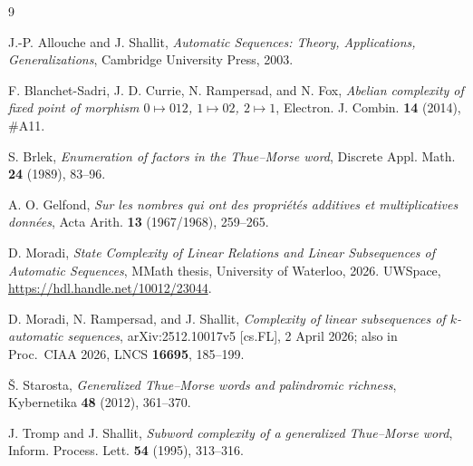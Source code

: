 \documentclass[10pt,reqno]{amsart}
\theoremstyle{plain}
\theoremstyle{definition}
\theoremstyle{remark}
\numberwithin{theorem}{section}
\begin{document}
\begin{thebibliography}{9}
\setlength{\itemsep}{0pt}\setlength{\parsep}{0pt}\setlength{\parskip}{0pt}

J.-P. Allouche and J. Shallit,
\emph{Automatic Sequences: Theory, Applications, Generalizations},
Cambridge University Press, 2003.

F. Blanchet-Sadri, J. D. Currie, N. Rampersad, and N. Fox,
\emph{Abelian complexity of fixed point of morphism $0 \mapsto 012$, $1 \mapsto 02$,
$2 \mapsto 1$},
Electron. J. Combin. \textbf{14} (2014), \#A11.

S. Brlek,
\emph{Enumeration of factors in the Thue--Morse word},
Discrete Appl. Math. \textbf{24} (1989), 83--96.

A. O. Gelfond,
\emph{Sur les nombres qui ont des propri\'et\'es additives et multiplicatives donn\'ees},
Acta Arith. \textbf{13} (1967/1968), 259--265.

D. Moradi,
\emph{State Complexity of Linear Relations and Linear Subsequences of Automatic Sequences},
MMath thesis, University of Waterloo, 2026. UWSpace,
\url{https://hdl.handle.net/10012/23044}.

D. Moradi, N. Rampersad, and J. Shallit,
\emph{Complexity of linear subsequences of $k$-automatic sequences},
arXiv:2512.10017v5 [cs.FL], 2 April 2026;
also in Proc.\ CIAA 2026, LNCS \textbf{16695}, 185--199.

\v{S}. Starosta,
\emph{Generalized Thue--Morse words and palindromic richness},
Kybernetika \textbf{48} (2012), 361--370.

J. Tromp and J. Shallit,
\emph{Subword complexity of a generalized Thue--Morse word},
Inform. Process. Lett. \textbf{54} (1995), 313--316.

\end{thebibliography}
\end{document}
